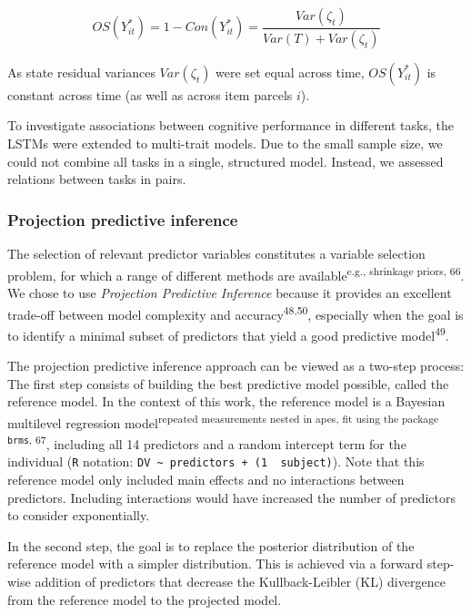 \documentclass[
  man,floatsintext]{apa6}
\begin{document}
\begin{equation}
OS(Y^*_{it})=1-Con(Y^*_{it}) = \frac{Var(\zeta_t)}{Var(T)+Var(\zeta_t)}
\end{equation}

As state residual variances \(Var(\zeta_t)\) were set equal across time, \(OS(Y^*_{it})\) is constant across time (as well as across item parcels \(i\)).

To investigate associations between cognitive performance in different tasks, the LSTMs were extended to multi-trait models. Due to the small sample size, we could not combine all tasks in a single, structured model. Instead, we assessed relations between tasks in pairs.

\hypertarget{projection-predictive-inference}{%
\subsubsection{Projection predictive inference}\label{projection-predictive-inference}}

The selection of relevant predictor variables constitutes a variable selection problem, for which a range of different methods are available\textsuperscript{e.g., shrinkage priors, 66}. We chose to use \emph{Projection Predictive Inference} because it provides an excellent trade-off between model complexity and accuracy\textsuperscript{48,50}, especially when the goal is to identify a minimal subset of predictors that yield a good predictive model\textsuperscript{49}.

The projection predictive inference approach can be viewed as a two-step process: The first step consists of building the best predictive model possible, called the reference model. In the context of this work, the reference model is a Bayesian multilevel regression model\textsuperscript{repeated measurements nested in apes, fit using the package \texttt{brms}, 67}, including all 14 predictors and a random intercept term for the individual (\texttt{R} notation: \texttt{DV\ \textasciitilde{}\ predictors\ +\ (1\ \textbar{}\ subject)}). Note that this reference model only included main effects and no interactions between predictors. Including interactions would have increased the number of predictors to consider exponentially.

In the second step, the goal is to replace the posterior distribution of the reference model with a simpler distribution. This is achieved via a forward step-wise addition of predictors that decrease the Kullback-Leibler (KL) divergence from the reference model to the projected model.
\end{document}
